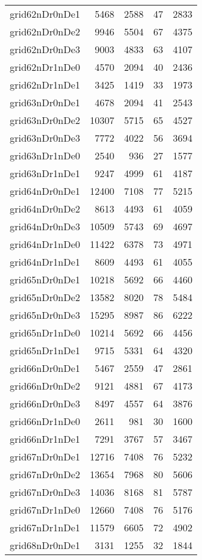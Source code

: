 \documentclass[../../../thesis.tex]{subfiles}
\begin{document}
\begin{longtable}{lrrrr}
grid62nDr0nDe1 & 5468 & 2588 & 47 & 2833 \\
grid62nDr0nDe2 & 9946 & 5504 & 67 & 4375 \\
grid62nDr0nDe3 & 9003 & 4833 & 63 & 4107 \\
grid62nDr1nDe0 & 4570 & 2094 & 40 & 2436 \\
grid62nDr1nDe1 & 3425 & 1419 & 33 & 1973 \\
grid63nDr0nDe1 & 4678 & 2094 & 41 & 2543 \\
grid63nDr0nDe2 & 10307 & 5715 & 65 & 4527 \\
grid63nDr0nDe3 & 7772 & 4022 & 56 & 3694 \\
grid63nDr1nDe0 & 2540 & 936 & 27 & 1577 \\
grid63nDr1nDe1 & 9247 & 4999 & 61 & 4187 \\
grid64nDr0nDe1 & 12400 & 7108 & 77 & 5215 \\
grid64nDr0nDe2 & 8613 & 4493 & 61 & 4059 \\
grid64nDr0nDe3 & 10509 & 5743 & 69 & 4697 \\
grid64nDr1nDe0 & 11422 & 6378 & 73 & 4971 \\
grid64nDr1nDe1 & 8609 & 4493 & 61 & 4055 \\
grid65nDr0nDe1 & 10218 & 5692 & 66 & 4460 \\
grid65nDr0nDe2 & 13582 & 8020 & 78 & 5484 \\
grid65nDr0nDe3 & 15295 & 8987 & 86 & 6222 \\
grid65nDr1nDe0 & 10214 & 5692 & 66 & 4456 \\
grid65nDr1nDe1 & 9715 & 5331 & 64 & 4320 \\
grid66nDr0nDe1 & 5467 & 2559 & 47 & 2861 \\
grid66nDr0nDe2 & 9121 & 4881 & 67 & 4173 \\
grid66nDr0nDe3 & 8497 & 4557 & 64 & 3876 \\
grid66nDr1nDe0 & 2611 & 981 & 30 & 1600 \\
grid66nDr1nDe1 & 7291 & 3767 & 57 & 3467 \\
grid67nDr0nDe1 & 12716 & 7408 & 76 & 5232 \\
grid67nDr0nDe2 & 13654 & 7968 & 80 & 5606 \\
grid67nDr0nDe3 & 14036 & 8168 & 81 & 5787 \\
grid67nDr1nDe0 & 12660 & 7408 & 76 & 5176 \\
grid67nDr1nDe1 & 11579 & 6605 & 72 & 4902 \\
grid68nDr0nDe1 & 3131 & 1255 & 32 & 1844 \\

\end{longtable}
\end{document}

